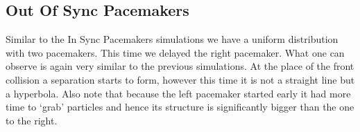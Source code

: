 \begin{minipage}{0.45\textwidth}
\subsection{Out Of Sync Pacemakers}
Similar to the In Sync Pacemakers simulations we have a uniform distribution with two pacemakers.
This time we delayed the right pacemaker.
What one can observe is again very similar to the previous simulations.
At the place of the front collision a separation starts to form, however this time it is not a straight line but a hyperbola.
Also note that because the left pacemaker started early it had more time to \lq{}grab\rq{} particles and hence its structure is significantly bigger than the one to the right.
\end{minipage}